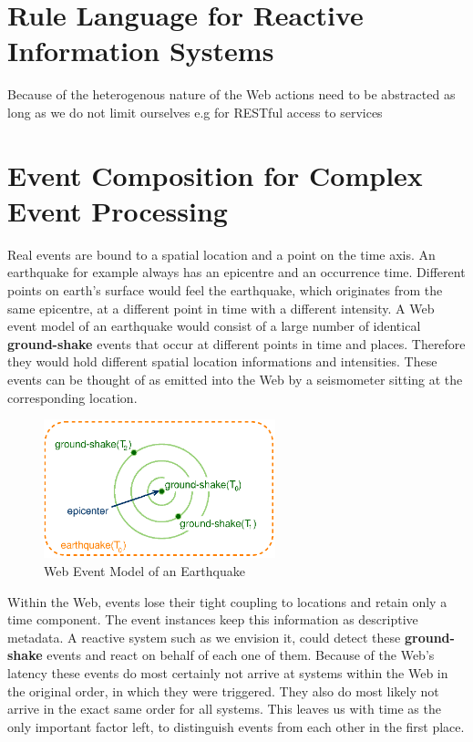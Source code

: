 \section{Rule Language for Reactive Information Systems}
Because of the heterogenous nature of the Web actions need to be abstracted
as long as we do not limit ourselves e.g for RESTful access to services


\section{Event Composition for Complex Event Processing}
Real events are bound to a spatial location and a point on the time axis.
An earthquake for example always has an epicentre and an occurrence time.
Different points on earth's surface would feel the earthquake, which originates from the same epicentre, at a different point in time with a different intensity.
A Web event model of an earthquake would consist of a large number of identical \textrm{\textbf{ground-shake}} events that occur at different points in time and places.
Therefore they would hold different spatial location informations and intensities.
These events can be thought of as emitted into the Web by a seismometer sitting at the corresponding location.
\begin{figure}[!ht]
  \centering
  \includegraphics[width=0.6\textwidth]{figures/Earthquake}
  \caption{Web Event Model of an Earthquake}
  \label{fig:Earthquake}
\end{figure}
Within the Web, events lose their tight coupling to locations and retain only a time component.
The event instances keep this information as descriptive metadata.
A reactive system such as we envision it, could detect these \textrm{\textbf{ground-shake}} events and react on behalf of each one of them.
Because of the Web's latency these events do most certainly not arrive at systems within the Web in the original order, in which they were triggered.
They also do most likely not arrive in the exact same order for all systems.
This leaves us with time as the only important factor left, to distinguish events from each other in the first place.
